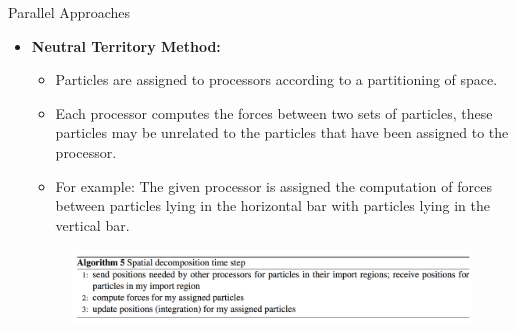 \documentclass[aspectratio=169]{beamer}
\begin{document}
\begin{frame}[fragile]{Parallel Approaches}


\begin{itemize}
\item \textbf{Neutral Territory Method:}
\begin{itemize}
\item Particles are assigned to processors according to a partitioning of space.
\item Each processor computes the forces between two sets of particles, these particles may be unrelated to the particles that have been assigned to the processor.
\item For example: The given processor is assigned the computation of forces between particles lying in the horizontal bar with particles lying in the vertical bar. 
\end{itemize}
\begin{figure}
\includegraphics[scale=0.3]{Graphics/slide_8.png}
\end{figure}
\end{itemize}


\end{frame}
\end{document}
